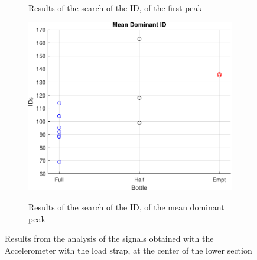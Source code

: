 \begin{figure}[]
\begin{subfigure}{0.45\textwidth}
        \caption{Results of the search of the ID, of the first peak}{}
        \label{subfig:fIDACCL}
    \end{subfigure}
    \begin{subfigure}{0.45\textwidth}
        \centering
        \includegraphics[width=\linewidth]{Chapters/6CHP/Figures/ResultsuCGraphs/Sen/BotMidAcCiMa18_05mID.pdf}
        \caption{Results of the search of the ID, of the mean dominant peak}{}
        \label{subfig:mIDACCL}
    \end{subfigure}
    \caption{Results from the analysis of the signals obtained with the Accelerometer with the load strap, at the center of the lower section}{}
    \label{fig:ACCLResAlg}
\end{figure}
